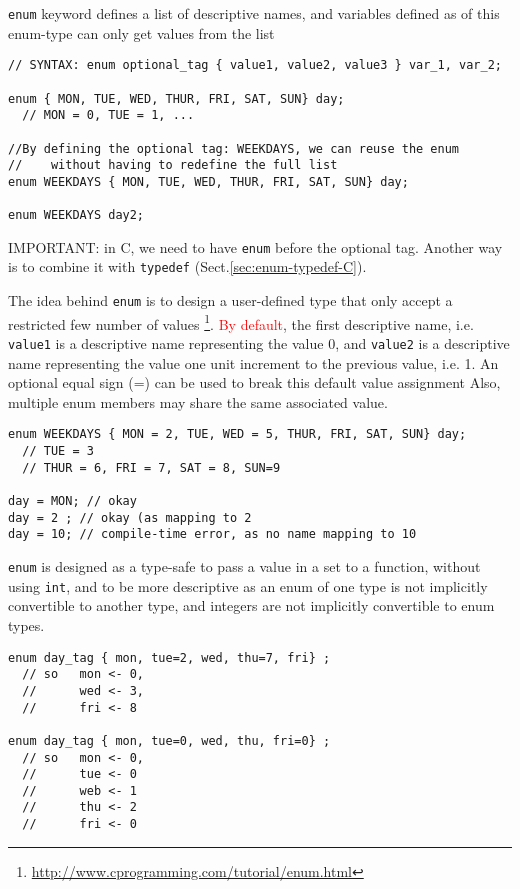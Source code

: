 \verb!enum! keyword defines a list of descriptive names, and variables defined
as of this enum-type can only get values from the list

\begin{verbatim}
// SYNTAX: enum optional_tag { value1, value2, value3 } var_1, var_2;

enum { MON, TUE, WED, THUR, FRI, SAT, SUN} day;
  // MON = 0, TUE = 1, ...

//By defining the optional tag: WEEKDAYS, we can reuse the enum
//    without having to redefine the full list
enum WEEKDAYS { MON, TUE, WED, THUR, FRI, SAT, SUN} day;

enum WEEKDAYS day2; 
\end{verbatim}
IMPORTANT: in C, we need to have \verb!enum! before the optional tag. Another
way is to combine it with \verb!typedef! (Sect.\ref{sec:enum-typedef-C}).

The idea behind \verb!enum! is to design a user-defined type that only accept a
restricted few number of values
\footnote{\url{http://www.cprogramming.com/tutorial/enum.html}}.
\textcolor{red}{By default}, the first descriptive name, i.e. \verb!value1! is a
descriptive name representing the value 0, and \verb!value2! is a descriptive
name representing the value one unit increment to the previous value, i.e. 1.
An optional equal sign (=) can be used to break this default value assignment
Also, multiple enum members may share the same associated value.

\begin{verbatim}
enum WEEKDAYS { MON = 2, TUE, WED = 5, THUR, FRI, SAT, SUN} day;
  // TUE = 3
  // THUR = 6, FRI = 7, SAT = 8, SUN=9

day = MON; // okay
day = 2 ; // okay (as mapping to 2
day = 10; // compile-time error, as no name mapping to 10
\end{verbatim}

\verb!enum! is designed as a type-safe to pass a value in a set to a function,
without using \verb!int!, and to be more descriptive as an enum of one type is
not implicitly convertible to another type, and integers are not implicitly
convertible to enum types.

\begin{verbatim}
enum day_tag { mon, tue=2, wed, thu=7, fri} ;
  // so   mon <- 0,
  //      wed <- 3,
  //      fri <- 8

enum day_tag { mon, tue=0, wed, thu, fri=0} ;
  // so   mon <- 0,
  //      tue <- 0
  //      web <- 1
  //      thu <- 2
  //      fri <- 0
\end{verbatim}

